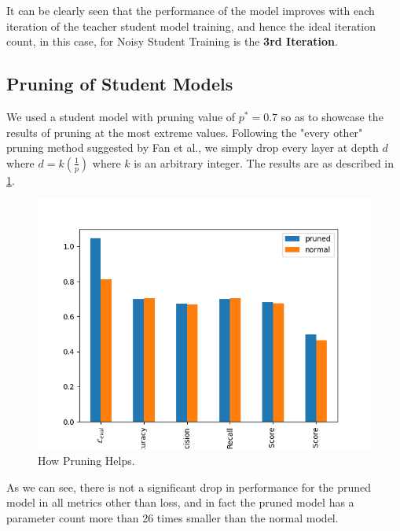 \documentclass[12pt]{article}
\begin{document}
{It can be clearly seen that the performance of the model improves with each iteration of the teacher student model training, and hence the ideal iteration count, in this case, for Noisy Student Training is the \textbf{3rd Iteration}.

\subsection{Pruning of Student Models}
We used a student model with pruning value of $p^*=0.7$ so as to showcase the results of pruning at the most extreme values. Following the "every other" pruning method suggested by Fan et al.\cite{layerdrop}, we simply drop every layer at depth $d$ where $d=k(\frac{1}{p})$ where $k$ is an arbitrary integer. The results are as described in \ref{fig:pruning}.

\begin{figure}[!ht]
    \begin{center}
        \includegraphics[scale=0.6]{images/prunedShow.png}
        \caption{How Pruning Helps.}
        \label{fig:pruning}
    \end{center}
\end{figure}

As we can see, there is not a significant drop in performance for the pruned model in all metrics other than loss, and in fact the pruned model has a parameter count more than 26 times smaller than the normal model. 

}
\end{document}
